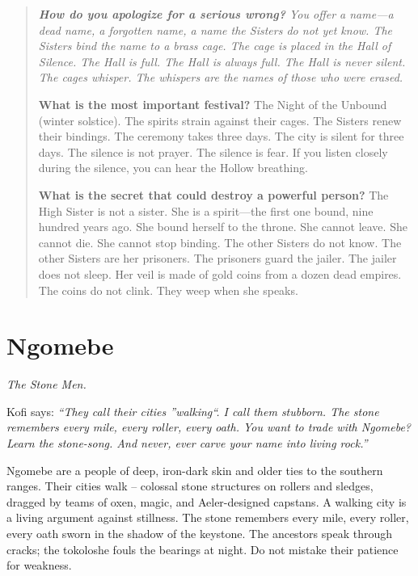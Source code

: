 \documentclass[12pt,oneside]{book}
\newenvironment{almanac}
  {\begin{quote}\small\itshape}
  {\end{quote}}
\begin{document}
\begin{almanac}
\textbf{How do you apologize for a serious wrong?} You offer a name---a dead name, a forgotten name, a name the Sisters do not yet know. The Sisters bind the name to a brass cage. The cage is placed in the Hall of Silence. The Hall is full. The Hall is always full. The Hall is never silent. The cages whisper. The whispers are the names of those who were erased.

\textbf{What is the most important festival?} The Night of the Unbound (winter solstice). The spirits strain against their cages. The Sisters renew their bindings. The ceremony takes three days. The city is silent for three days. The silence is not prayer. The silence is fear. If you listen closely during the silence, you can hear the Hollow breathing.

\textbf{What is the secret that could destroy a powerful person?} The High Sister is not a sister. She is a spirit---the first one bound, nine hundred years ago. She bound herself to the throne. She cannot leave. She cannot die. She cannot stop binding. The other Sisters do not know. The other Sisters are her prisoners. The prisoners guard the jailer. The jailer does not sleep. Her veil is made of gold coins from a dozen dead empires. The coins do not clink. They weep when she speaks.
\end{almanac}

\newpage

\newpage

\chapter{Ngomebe}
\emph{The Stone Men.}

\noindent
Kofi says: \textit{``They call their cities ''walking``. I call them stubborn. The stone remembers every mile, every roller, every oath. You want to trade with Ngomebe? Learn the stone-song. And never, ever carve your name into living rock.''}

\noindent
Ngomebe are a people of deep, iron-dark skin and older ties to the southern ranges. Their cities walk -- colossal stone structures on rollers and sledges, dragged by teams of oxen, magic, and Aeler-designed capstans. A walking city is a living argument against stillness. The stone remembers every mile, every roller, every oath sworn in the shadow of the keystone. The ancestors speak through cracks; the tokoloshe fouls the bearings at night. Do not mistake their patience for weakness.
\end{document}
